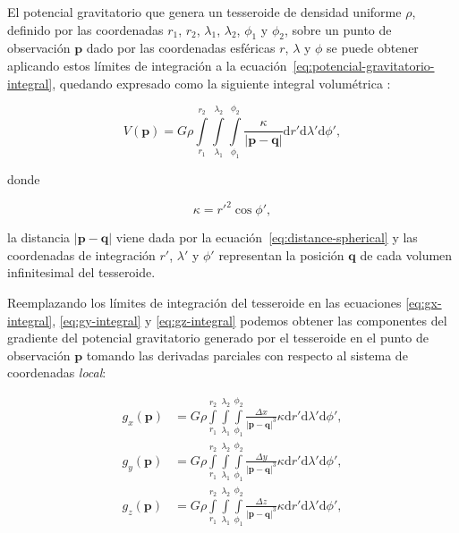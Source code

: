 El potencial gravitatorio que genera un tesseroide de densidad uniforme $\rho$,
definido por las coordenadas $r_1$, $r_2$, $\lambda_1$, $\lambda_2$, $\phi_1$
y $\phi_2$, sobre un punto de observación $\mathbf{p}$ dado por las coordenadas
esféricas $r$, $\lambda$ y $\phi$ se puede obtener aplicando estos límites de
integración a la ecuación~\ref{eq:potencial-gravitatorio-integral}, quedando
expresado como la siguiente integral volumétrica
\citep{grombein2013,uieda2016}:

\begin{equation}
    V(\mathbf{p}) = G \rho
        \int\limits_{r_1}^{r_2}
        \int\limits_{\lambda_1}^{\lambda_2}
        \int\limits_{\phi_1}^{\phi_2}
        \frac{\kappa}{|\mathbf{p} - \mathbf{q}|}
        \text{d}r' \text{d}\lambda' \text{d}\phi',
    \label{eq:potencial-tesseroide}
\end{equation}

\noindent donde

\begin{equation}
    \kappa = {r'}^2 \cos \phi',
    \label{eq:kappa}
\end{equation}

\noindent la distancia $|\mathbf{p} - \mathbf{q}|$ viene dada por la
ecuación~\ref{eq:distance-spherical} y las coordenadas de integración $r'$,
$\lambda'$ y $\phi'$ representan la posición $\mathbf{q}$ de cada volumen
infinitesimal del tesseroide.

Reemplazando los límites de integración del tesseroide en las ecuaciones
\ref{eq:gx-integral}, \ref{eq:gy-integral} y \ref{eq:gz-integral} podemos
obtener las componentes del gradiente del potencial gravitatorio generado por
el tesseroide en el punto de observación $\mathbf{p}$ tomando las derivadas
parciales con respecto al sistema de coordenadas \emph{local}:


\begin{align}
    g_x(\mathbf{p}) &=
        G \rho
        \int\limits_{r_1}^{r_2}
        \int\limits_{\lambda_1}^{\lambda_2}
        \int\limits_{\phi_1}^{\phi_2}
        \frac{\Delta x}{|\mathbf{p} - \mathbf{q}|^3}
        \kappa
        \text{d}r' \text{d}\lambda' \text{d}\phi',
    \label{eq:gx-tesseroide}
    \\
    g_y(\mathbf{p}) &=
        G \rho
        \int\limits_{r_1}^{r_2}
        \int\limits_{\lambda_1}^{\lambda_2}
        \int\limits_{\phi_1}^{\phi_2}
        \frac{\Delta y}{|\mathbf{p} - \mathbf{q}|^3}
        \kappa
        \text{d}r' \text{d}\lambda' \text{d}\phi',
    \label{eq:gy-tesseroide}
    \\
    g_z(\mathbf{p}) &=
        G \rho
        \int\limits_{r_1}^{r_2}
        \int\limits_{\lambda_1}^{\lambda_2}
        \int\limits_{\phi_1}^{\phi_2}
        \frac{\Delta z}{|\mathbf{p} - \mathbf{q}|^3}
        \kappa
        \text{d}r' \text{d}\lambda' \text{d}\phi',
    \label{eq:gz-tesseroide}
\end{align}


